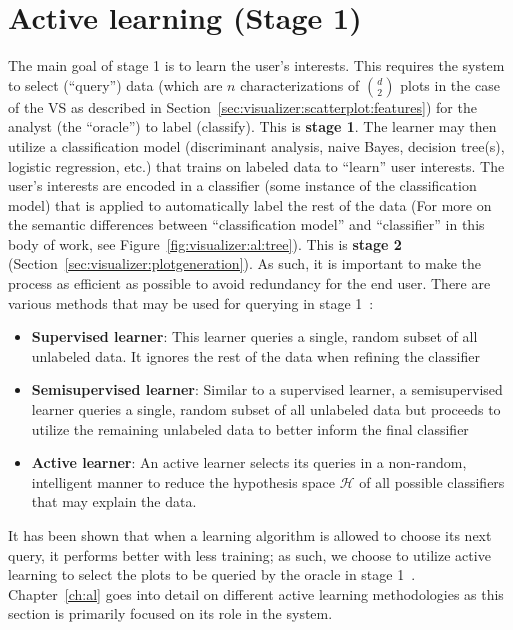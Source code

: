 \section{Active learning (Stage 1)}
\label{sec:visualizer:al}

The main goal of stage 1 is to learn the user's interests. This requires the 
system to select (``query'') data (which are $n$ characterizations of $d\choose 
2$ plots in the case of the VS as described in 
Section~\ref{sec:visualizer:scatterplot:features}) for the analyst (the 
``oracle'') to label (classify). This is \textbf{stage 1}. 
The learner may then utilize 
a classification model (discriminant analysis, naive Bayes, decision tree(s), 
logistic regression, etc.) that trains on labeled data to ``learn'' user 
interests. The user's interests are encoded in a classifier (some instance of 
the classification model) that is applied to automatically label the rest of 
the data (For more on the 
semantic differences between ``classification model'' and ``classifier'' in 
this body of work, see Figure~\ref{fig:visualizer:al:tree}). This is 
\textbf{stage 2} (Section~\ref{sec:visualizer:plotgeneration}). 
As such, it is important to make the process as efficient as possible to avoid 
redundancy for the end user. There are various methods that may be used for 
querying in stage 1~\cite{dasgupta2011}:

\tablespacing
\begin{itemize}
	\item \textbf{Supervised learner}: This learner queries a single, random 
	subset of all unlabeled data. It ignores the rest of the data when refining 
	the classifier
	\item \textbf{Semisupervised learner}: Similar to a supervised learner, a 
	semisupervised learner queries a single, random subset of all 
	unlabeled data but proceeds to utilize the remaining unlabeled data to 
	better inform the final classifier
	\item \textbf{Active learner}: An active learner selects its queries in a 
	non-random, intelligent manner to reduce the hypothesis space $\mathcal{H}$ 
	of all possible classifiers that may explain the data.
\end{itemize}
\bodyspacing

It has been 
shown that when a learning algorithm is allowed to choose its next query, it 
performs better with less training; as such, we choose to utilize active 
learning to select the plots to be queried by the oracle in stage 
1~\cite{settles2010}. Chapter~\ref{ch:al} goes into detail on different active 
learning methodologies as this section is primarily focused on its role in the 
system.

